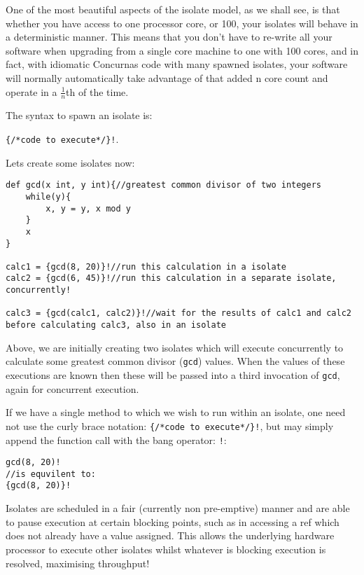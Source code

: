 \documentclass[conc-doc]{subfiles}
\begin{document}
One of the most beautiful aspects of the isolate model, as we shall see, is that whether you have access to one processor core, or 100, your isolates will behave in a deterministic manner. This means that you don't have to re-write all your software when upgrading from a single core machine to one with 100 cores, and in fact, with idiomatic Concurnas code with many spawned isolates, your software will normally automatically take advantage of that added n core count and operate in a $\frac{1}{n}$th of the time.

The syntax to spawn an isolate is: 
\begin{center}
	\lstinline!{/*code to execute*/}!\lstinline{!}. 
\end{center}

Lets create some isolates now:
\begin{lstlisting}
def gcd(x int, y int){//greatest common divisor of two integers
	while(y){
		x, y = y, x mod y
	}
	x
}

calc1 = {gcd(8, 20)}!//run this calculation in a isolate
calc2 = {gcd(6, 45)}!//run this calculation in a separate isolate, concurrently!

calc3 = {gcd(calc1, calc2)}!//wait for the results of calc1 and calc2 before calculating calc3, also in an isolate
\end{lstlisting}

Above, we are initially creating two isolates which will execute concurrently to calculate some greatest common divisor (\lstinline{gcd}) values. When the values of these executions are known then these will be passed into a third invocation of \lstinline{gcd}, again for concurrent execution.

If we have a single method to which we wish to run within an isolate, one need not use the curly brace notation: \lstinline!{/*code to execute*/}!\lstinline{!}, but may simply append the function call with the bang operator: \lstinline{!}:

\begin{lstlisting}
gcd(8, 20)!
//is equvilent to:
{gcd(8, 20)}!
\end{lstlisting}

Isolates are scheduled in a fair (currently non pre-emptive) manner and are able to pause execution at certain blocking points, such as in accessing a ref which does not already have a value assigned. This allows the underlying hardware processor to execute other isolates whilst whatever is blocking execution is resolved, maximising throughput!
\end{document}
